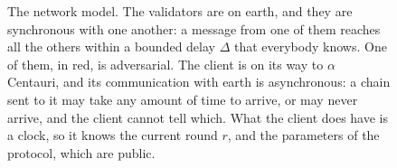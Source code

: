 \begin{figure}[t]
\caption{The network model. The validators are on earth, and they are
synchronous with one another: a message from one of them reaches all the others
within a bounded delay $\Delta$ that everybody knows. One of them, in red, is
adversarial. The client is on its way to $\alpha$ Centauri, and its
communication with earth is asynchronous: a chain sent to it may take any amount of time to
arrive, or may never arrive, and the client cannot tell which. What the client
does have is a clock, so it knows the current round $r$, and the parameters of
the protocol, which are public.}\label{fig.model}
\end{figure}
